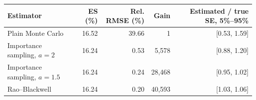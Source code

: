 \begin{tabular}{lrrrr}
\toprule
Estimator & ES (\%) & Rel. RMSE (\%) & Gain & Estimated / true SE, 5\%--95\% \\
\midrule
Plain Monte Carlo & 16.52 & 39.66 & 1 & [0.53, 1.59] \\
Importance sampling, $a = 2$ & 16.24 & 0.53 & 5,578 & [0.88, 1.20] \\
Importance sampling, $a = 1.5$ & 16.24 & 0.24 & 28,468 & [0.95, 1.02] \\
Rao--Blackwell & 16.24 & 0.20 & 40,593 & [1.03, 1.06] \\
\bottomrule
\end{tabular}
